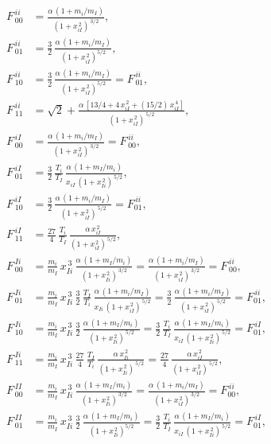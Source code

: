 \documentclass[notitlepage,12pt]{article}
\begin{document}
\begin{align}
F^{\,ii}_{\,00} &= \frac{\alpha\,(1+m_i/m_I)}{(1+x_{iI}^{\,2})^{\,3/2}},\\[0.5ex]
F^{\,ii}_{\,01}&=\frac{3}{2}\,\frac{\alpha\,(1+m_i/m_I)}{(1+x_{iI}^{\,2})^{5/2}},\\[0.5ex]
F^{\,ii}_{\,10}&=\frac{3}{2}\,\frac{\alpha\,(1+m_i/m_I)}{(1+x_{iI}^{\,2})^{5/2}}=F^{\,ii}_{\,01},\\[0.5ex]
F^{\,ii}_{\,11}& =\sqrt{2}+ \frac{\alpha\,[13/4+4\,x_{iI}^{\,2}+(15/2)\,x_{iI}^{\,4}]}{(1+x_{iI}^{\,2})^{\,5/2}},\\[0.5ex]
F^{\,iI}_{\,00} &=\frac{\alpha\,(1+m_i/m_I)}{(1+x_{iI}^{\,2})^{\,3/2}}=F^{\,ii}_{\,00},\\[0.5ex]
F^{\,iI}_{\,01}&= \frac{3}{2}\,\frac{T_i}{T_I}\,\frac{\alpha\,(1+m_I/m_i)}{x_{iI}\,(1+x_{Ii}^{\,2})^{\,5/2}},\\[0.5ex]
F^{\,iI}_{\,10}&=\frac{3}{2}\,\frac{\alpha\,(1+m_i/m_I)}{(1+x_{iI}^{\,2})^{\,5/2}}=F^{\,ii}_{01},\\[0.5ex]
F^{\,iI}_{\,11}& =\frac{27}{4}\,\frac{T_i}{T_I}\,\frac{\alpha\,x_{iI}^{\,2}}{(1+x_{iI}^{\,2})^{\,5/2}},\\[0.5ex]
F^{\,Ii}_{\,00} &=\frac{m_i}{m_I}\,x_{Ii}^{\,3}\,\frac{\alpha\,(1+m_I/m_i)}{(1+x_{Ii}^{\,2})^{\,3/2}}=
\frac{\alpha\,(1+m_i/m_I)}{(1+x_{iI}^{\,2})^{\,3/2}}=F^{\,ii}_{\,00},\\[0.5ex]
F^{\,Ii}_{\,01}&=\frac{m_i}{m_I}\,x_{Ii}^{\,3}\,\frac{3}{2}\,\frac{T_I}{T_i}\,\frac{\alpha\,(1+m_i/m_I)}{x_{Ii}\,(1+x_{iI}^{\,2})^{\,5/2}}=\frac{3}{2}\,\frac{\alpha\,(1+m_i/m_I)}{(1+x_{iI}^{\,2})^{\,5/2}}=F^{\,ii}_{01},\\[0.5ex]
F^{\,Ii}_{\,10}&=\frac{m_i}{m_I}\,x_{Ii}^{\,3}\,\frac{3}{2}\,\frac{\alpha\,(1+m_I/m_i)}{(1+x_{Ii}^{\,2})^{\,5/2}}=\frac{3}{2}\,\frac{T_i}{T_I}\,\frac{\alpha\,(1+m_I/m_i)}{x_{iI}\,(1+x_{Ii}^{\,2})^{\,5/2}}=F^{\,iI}_{01},\\[0.5ex]
F^{\,Ii}_{\,11}& =\frac{m_i}{m_I}\,x_{Ii}^{\,3}\,\frac{27}{4}\,\frac{T_I}{T_i}\,\frac{\alpha\,x_{Ii}^{\,2}}{(1+x_{Ii}^{\,2})^{\,5/2}}=\frac{27}{4}\,\frac{\alpha\,x_{iI}^{\,2}}{(1+x_{iI}^{\,2})^{\,5/2}},\\[0.5ex]
F^{\,II}_{\,00} &= \frac{m_i}{m_I}\,x_{Ii}^{\,3}\,\frac{\alpha\,(1+m_I/m_i)}{(1+x_{Ii}^{\,2})^{\,3/2}}=\frac{\alpha\,(1+m_i/m_I)}{(1+x_{iI}^{\,2})^{\,3/2}}=F^{\,ii}_{00},\\[0.5ex]
F^{\,II}_{\,01}&=\frac{m_i}{m_I}\,x_{Ii}^{\,3}\,\frac{3}{2}\,\frac{\alpha\,(1+m_I/m_i)}{(1+x_{Ii}^{\,2})^{5/2}}
=\frac{3}{2}\,\frac{T_i}{T_I}\,\frac{\alpha\,(1+m_I/m_i)}{x_{iI}\,(1+x_{Ii}^{\,2})^{\,5/2}}=F^{\,iI}_{01},\\[0.5ex]

\end{align}
\end{document}
